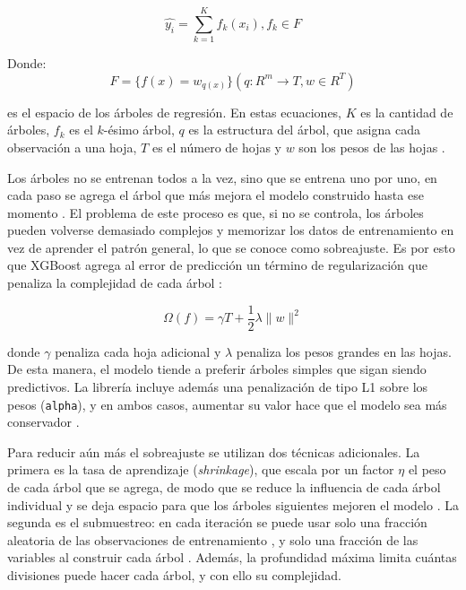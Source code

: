     \begin{equation}
        \hat{y_i} = \sum_{k=1}^{K} f_k(x_i), f_k \in F
    \end{equation}

    Donde:
    \begin{equation}
        F = \{f(x) = w_{q(x)}\} (q: R^m \rightarrow T, w \in R^T)
    \end{equation}

    es el espacio de los árboles de regresión. En estas ecuaciones, $K$ es la cantidad de árboles, $f_k$ es el $k$-ésimo árbol, $q$ es la estructura del árbol, que asigna cada observación a una hoja, $T$ es el número de hojas y $w$ son los pesos de las hojas \cite{chen2016xgboost}.

    Los árboles no se entrenan todos a la vez, sino que se entrena uno por uno, en cada paso se agrega el árbol que más mejora el modelo construido hasta ese momento \cite{chen2016xgboost}. El problema de este proceso es que, si no se controla, los árboles pueden volverse demasiado complejos y memorizar los datos de entrenamiento en vez de aprender el patrón general, lo que se conoce como sobreajuste. Es por esto que XGBoost agrega al error de predicción un término de regularización que penaliza la complejidad de cada árbol \cite{chen2016xgboost}:

    \begin{equation}
    \Omega(f) = \gamma T + \frac{1}{2}\lambda \lVert w \rVert^2
    \end{equation}

    donde $\gamma$ penaliza cada hoja adicional y $\lambda$ penaliza los pesos grandes en las hojas. De esta manera, el modelo tiende a preferir árboles simples que sigan siendo predictivos. La librería incluye además una penalización de tipo L1 sobre los pesos (\texttt{alpha}), y en ambos casos, aumentar su valor hace que el modelo sea más conservador \cite{xgboostdocs}.

    Para reducir aún más el sobreajuste se utilizan dos técnicas adicionales. La primera es la tasa de aprendizaje (\textit{shrinkage}), que escala por un factor $\eta$ el peso de cada árbol que se agrega, de modo que se reduce la influencia de cada árbol individual y se deja espacio para que los árboles siguientes mejoren el modelo \cite{chen2016xgboost}. La segunda es el submuestreo: en cada iteración se puede usar solo una fracción aleatoria de las observaciones de entrenamiento \cite{xgboostdocs}, y solo una fracción de las variables al construir cada árbol \cite{chen2016xgboost, xgboostdocs}. Además, la profundidad máxima limita cuántas divisiones puede hacer cada árbol, y con ello su complejidad.

